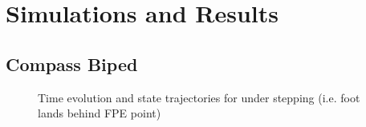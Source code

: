 
\section{Simulations and Results} %
\label{sec:simulations_and_results}


\subsection{Compass Biped} %
\label{sub:2d_simulations}

\begin{figure}[!h]
	\begin{center}
	\end{center}
  	\caption{Time evolution and state trajectories for under stepping (i.e. foot lands behind FPE point)}
	\label{sim:under}
\end{figure}

